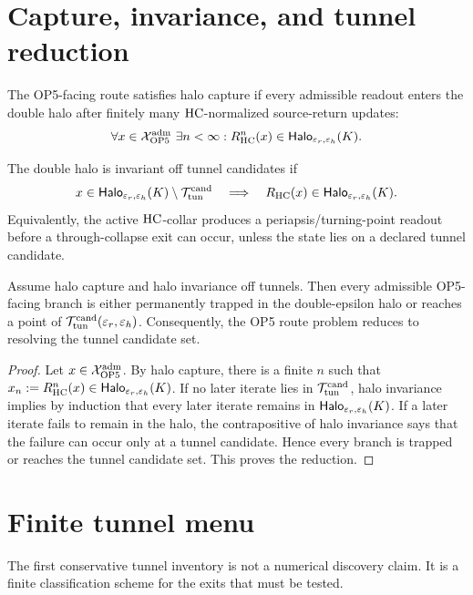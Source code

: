 \section{Capture, invariance, and tunnel reduction}

\begin{definition}
The OP5-facing route satisfies halo capture if every admissible readout enters the double halo after finitely many \(\mathrm{HC}\)-normalized source-return updates:
\[
\forall x\in\mathcal X_{\mathrm{OP} 5}^{\mathrm{adm}}\ \exists n<\infty:
R_{\mathrm{HC}}^{n}(x)\in\mathsf{Halo}_{\varepsilon_r,\varepsilon_h}(K).
\]
\end{definition}

\begin{definition}
The double halo is invariant off tunnel candidates if
\[
x\in\mathsf{Halo}_{\varepsilon_r,\varepsilon_h}(K)\setminus\mathcal T_{\mathrm{tun}}^{\mathrm{cand}}
\quad\Longrightarrow\quad
R_{\mathrm{HC}}(x)\in\mathsf{Halo}_{\varepsilon_r,\varepsilon_h}(K).
\]
Equivalently, the active \(\mathrm{HC}\)-collar produces a periapsis/turning-point readout before a through-collapse exit can occur, unless the state lies on a declared tunnel candidate.
\end{definition}

\begin{proposition}
Assume halo capture and halo invariance off tunnels. Then every admissible OP5-facing branch is either permanently trapped in the double-epsilon halo or reaches a point of \(\mathcal T_{\mathrm{tun}}^{\mathrm{cand}}(\varepsilon_r,\varepsilon_h)\). Consequently, the OP5 route problem reduces to resolving the tunnel candidate set.
\end{proposition}

\begin{proof}
Let \(x\in\mathcal X_{\mathrm{OP} 5}^{\mathrm{adm}}\). By halo capture, there is a finite \(n\) such that \(x_n:=R_{\mathrm{HC}}^{n}(x)\in\mathsf{Halo}_{\varepsilon_r,\varepsilon_h}(K)\). If no later iterate lies in \(\mathcal T_{\mathrm{tun}}^{\mathrm{cand}}\), halo invariance implies by induction that every later iterate remains in \(\mathsf{Halo}_{\varepsilon_r,\varepsilon_h}(K)\). If a later iterate fails to remain in the halo, the contrapositive of halo invariance says that the failure can occur only at a tunnel candidate. Hence every branch is trapped or reaches the tunnel candidate set. This proves the reduction.
\end{proof}

\section{Finite tunnel menu}

The first conservative tunnel inventory is not a numerical discovery claim. It is a finite classification scheme for the exits that must be tested.

